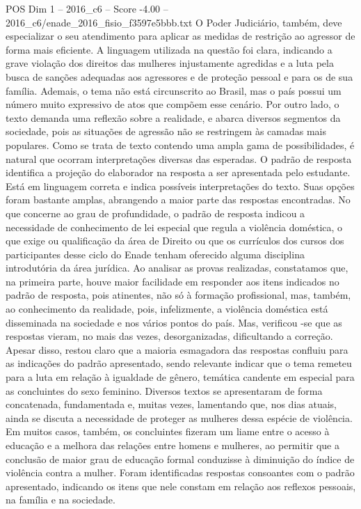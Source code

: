 \begin{textsample}{POS Dim 1 – 2016\_c6 – Score -4.00 – 2016\_c6/enade\_2016\_fisio\_f3597e5bbb.txt}
O Poder Judiciário, também, deve especializar o seu atendimento para aplicar as medidas de restrição ao agressor de forma mais eficiente.
A linguagem utilizada na questão foi clara, indicando a grave violação dos direitos das mulheres injustamente agredidas e a luta pela busca de sanções adequadas aos agressores e de proteção pessoal e para os de sua família.
Ademais, o tema não está circunscrito ao Brasil, mas o país possui um número muito expressivo de atos que compõem esse cenário.
Por outro lado, o texto demanda uma reflexão sobre a realidade, e abarca diversos segmentos da sociedade, pois as situações de agressão não se restringem às camadas mais populares.
Como se trata de texto contendo uma ampla gama de possibilidades, é natural que ocorram interpretações diversas das esperadas.
O padrão de resposta identifica a projeção do elaborador na resposta a ser apresentada pelo estudante.
Está em linguagem correta e indica possíveis interpretações do texto.
Suas opções foram bastante amplas, abrangendo a maior parte das respostas encontradas.
No que concerne ao grau de profundidade, o padrão de resposta indicou a necessidade de conhecimento de lei especial que regula a violência doméstica, o que exige ou qualificação da área de Direito ou que os currículos dos cursos dos participantes desse ciclo do Enade tenham oferecido alguma disciplina introdutória da área jurídica.
Ao analisar as provas realizadas, constatamos que, na primeira parte, houve maior facilidade em responder aos itens indicados no padrão de resposta, pois atinentes, não só à formação profissional, mas, também, ao conhecimento da realidade, pois, infelizmente, a violência doméstica está disseminada na sociedade e nos vários pontos do país.
Mas, verificou -se que as respostas vieram, no mais das vezes, desorganizadas, dificultando a correção.
Apesar disso, restou claro que a maioria esmagadora das respostas confluiu para as indicações do padrão apresentado, sendo relevante indicar que o tema remeteu para a luta em relação à igualdade de gênero, temática candente em especial para as concluintes do sexo feminino.
Diversos textos se apresentaram de forma concatenada, fundamentada e, muitas vezes, lamentando que, nos dias atuais, ainda se discuta a necessidade de proteger as mulheres dessa espécie de violência.
Em muitos casos, também, os concluintes fizeram um liame entre o acesso à educação e a melhora das relações entre homens e mulheres, ao permitir que a conclusão de maior grau de educação formal conduzisse à diminuição do índice de violência contra a mulher.
Foram identificadas respostas consoantes com o padrão apresentado, indicando os itens que nele constam em relação aos reflexos pessoais, na família e na sociedade.

\end{textsample}
